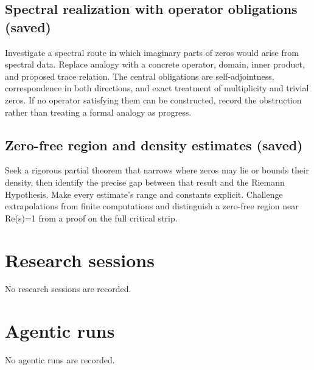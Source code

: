 \documentclass[11pt]{article}
\begin{document}
\subsection{Spectral realization with operator obligations (saved)}
Investigate a spectral route in which imaginary parts of zeros would arise from spectral data. Replace analogy with a concrete operator, domain, inner product, and proposed trace relation. The central obligations are self-adjointness, correspondence in both directions, and exact treatment of multiplicity and trivial zeros. If no operator satisfying them can be constructed, record the obstruction rather than treating a formal analogy as progress.\par
\subsection{Zero-free region and density estimates (saved)}
Seek a rigorous partial theorem that narrows where zeros may lie or bounds their density, then identify the precise gap between that result and the Riemann Hypothesis. Make every estimate's range and constants explicit. Challenge extrapolations from finite computations and distinguish a zero-free region near Re(s)=1 from a proof on the full critical strip.\par
\section{Research sessions}
No research sessions are recorded.\par
\section{Agentic runs}
No agentic runs are recorded.\par
\end{document}
